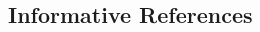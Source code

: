 \documentclass{metanorma}
\begin{document}
\subsection{Informative References}
\begin{thebibliography}{1}



\end{thebibliography}

\end{document}
